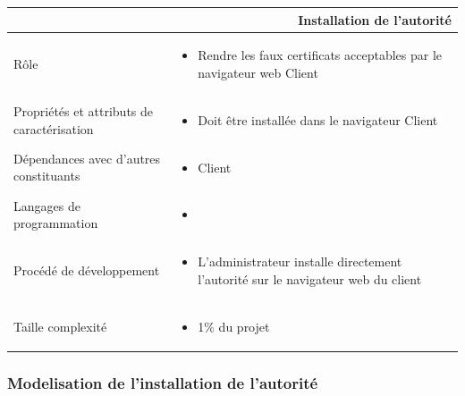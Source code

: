 \documentclass[a4paper,11pt,french]{article}
\begin{document}
\begin{center}
        \vspace*{0.7cm}
        \begin{tabularx}{16cm}{|l|X|}
        \hline
        \multicolumn{2}{|r|}{\textbf{Installation de l'autorité}}\\
        \hline
        R\^ole &  \begin{itemize}\item Rendre les faux certificats acceptables par le navigateur web Client\end{itemize}\\
        \hline
        Propriétés et attributs de caractérisation & \begin{itemize} \item  Doit \^etre installée dans le navigateur Client \end{itemize}\\
        \hline
        Dépendances avec d'autres constituants & \begin{itemize}\item Client\end{itemize}\\
        \hline
        Langages de programmation & \begin{itemize} \item  \end{itemize}\\
        \hline
        Procédé de développement & \begin{itemize}\item L'administrateur installe directement l'autorité sur le navigateur web du client\end{itemize}\\
        \hline
        Taille complexité & \begin{itemize}\item 1\% du projet\end{itemize}\\
        \hline
        \end{tabularx}
\end{center}

\subsubsection{Modelisation de l'installation de l'autorité}

\end{document}
